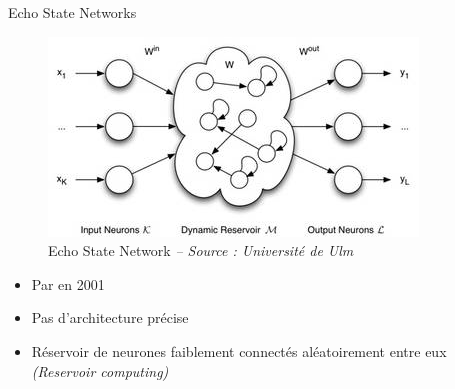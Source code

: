 \begin{frame}{Echo State Networks}
    \begin{figure}
        \includegraphics[height=.35\textheight,width=\textwidth,keepaspectratio]{images/echo}
        \caption{Echo State Network {\scriptsize\it -- Source : Université de Ulm}}
    \end{figure}
    \vspace{-.3cm}
    \begin{itemize} 
        \item Par \citeauthor{Jaeger01} en 2001 \cite{Jaeger01}
        \item Pas d'architecture précise
        \item Réservoir de neurones faiblement connectés aléatoirement entre eux \textit{(Reservoir computing)}
    \end{itemize}
\end{frame}


